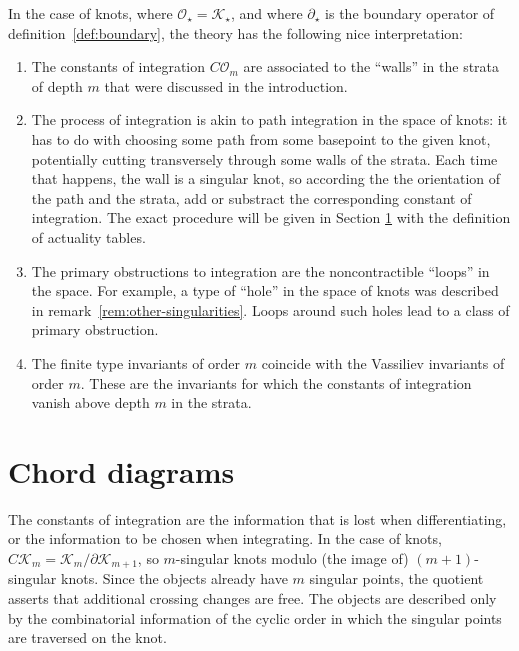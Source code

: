 \begin{remarks}

	In the case of knots, where \(\mathcal{O}_{\star} = \mathcal{K}_{\star}\), and where \(\partial_{\star}\) is the boundary operator of definition~\ref{def:boundary}, the theory has the following nice interpretation:

	\begin{enumerate}
		\item The constants of integration \(C\mathcal{O}_{m}\) are associated to the ``walls'' in the strata of depth \(m\) that were discussed in the introduction.

		\item The process of integration is akin to path integration in the space of knots: it has to do with choosing some path from some basepoint to the given knot, potentially cutting transversely through some walls of the strata. Each time that happens, the wall is a singular knot, so according the the orientation of the path and the strata, add or substract the corresponding constant of integration. The exact procedure will be given in Section \ref{sec:chord-diagrams} with the definition of actuality tables.

		\item The primary obstructions to integration are the noncontractible ``loops'' in the space. For example, a type of ``hole'' in the space of knots was described in remark~\ref{rem:other-singularities}. Loops around such holes lead to a class of primary obstruction.

		\item The finite type invariants of order \(m\) coincide with the Vassiliev invariants of order \(m\). These are the invariants for which the constants of integration vanish above depth \(m\) in the strata.

	\end{enumerate}
\end{remarks}


\section{Chord diagrams}
\label{sec:chord-diagrams}

The constants of integration are the information that is lost when differentiating, or the information to be chosen when integrating. In the case of knots, \(C\mathcal{K}_{m} = \mathcal{K}_{m} / \partial \mathcal{K}_{m + 1}\), so \(m\)-singular knots modulo (the image of) \((m + 1)\)-singular knots. Since the objects already have \(m\) singular points, the quotient asserts that additional crossing changes are free. The objects are described only by the combinatorial information of the cyclic order in which the singular points are traversed on the knot.


